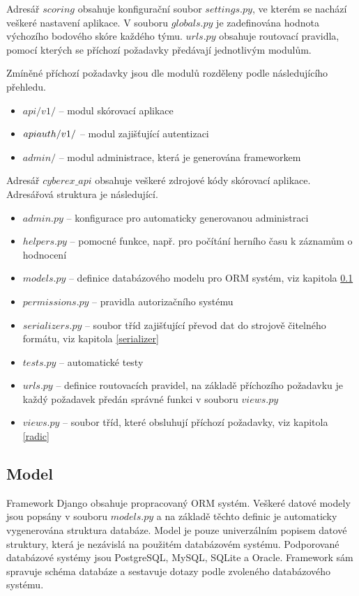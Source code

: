\documentclass[
  digital, %
  twoside, %
  table,   %
  lof,     %
  lot,     %
]{fithesis3}
\begin{document}
Adresář $scoring$ obsahuje konfigurační soubor $settings.py$, ve kterém se nachází veškeré nastavení aplikace. V souboru $globals.py$ je zadefinována hodnota výchozího bodového skóre každého týmu. $urls.py$ obsahuje routovací pravidla, pomocí kterých se příchozí požadavky předávají jednotlivým modulům.

Zmíněné příchozí požadavky jsou dle modulů rozděleny podle následujícího přehledu.

\begin{itemize}
    \item $api/v1/$ -- modul skórovací aplikace
    \item $api\-auth/v1/$ -- modul zajišťující autentizaci
    \item $admin/$ -- modul administrace, která je generována frameworkem
\end{itemize}

Adresář $cyberex\_api$ obsahuje veškeré zdrojové kódy skórovací aplikace. Adresářová struktura je následující.

\begin{itemize}
    \item $admin.py$ -- konfigurace pro automaticky generovanou administraci
    \item $helpers.py$ -- pomocné funkce, např. pro počítání herního času k záznamům o hodnocení
    \item $models.py$ -- definice databázového modelu pro ORM systém, viz kapitola \ref{model}
    \item $permissions.py$ -- pravidla autorizačního systému
    \item $serializers.py$ -- soubor tříd zajišťující převod dat do strojově čitelného formátu, viz kapitola \ref{serializer}
    \item $tests.py$ -- automatické testy
    \item $urls.py$ -- definice routovacích pravidel, na základě příchozího požadavku je každý požadavek předán správné funkci v souboru $views.py$
    \item $views.py$ -- soubor tříd, které obsluhují příchozí požadavky, viz kapitola \ref{radic}
\end{itemize}

\subsection{Model}
\label{model}
Framework Django obsahuje propracovaný ORM systém. Veškeré datové modely jsou popsány v souboru $models.py$ a na základě těchto definic je automaticky vygenerována struktura databáze. Model je pouze univerzálním popisem datové struktury, která je nezávislá na použitém databázovém systému. Podporované databázové systémy jsou PostgreSQL, MySQL, SQLite a Oracle. Framework sám spravuje schéma databáze a sestavuje dotazy podle zvoleného databázového systému.
\end{document}
